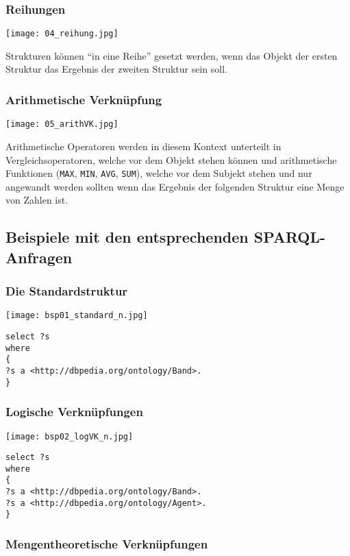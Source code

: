 \subsubsection*{Reihungen}
\texttt{[image: 04\_reihung.jpg]}


Strukturen können “in eine Reihe” gesetzt werden, wenn das Objekt der ersten Struktur das Ergebnis der zweiten Struktur sein soll.

\subsubsection*{Arithmetische Verknüpfung}
\texttt{[image: 05\_arithVK.jpg]}

Arithmetische Operatoren werden in diesem Kontext unterteilt in Vergleichsoperatoren, welche vor dem Objekt stehen können und arithmetische Funktionen (\verb+MAX+, \verb+MIN+, \verb+AVG+, \verb+SUM+), welche vor dem Subjekt stehen und nur angewandt werden sollten wenn das Ergebnis der folgenden Struktur eine Menge von Zahlen ist.

\subsection*{Beispiele mit den entsprechenden SPARQL-Anfragen}

\subsubsection*{Die Standardstruktur}

\texttt{[image: bsp01\_standard\_n.jpg]}

\begin{verbatim}
select ?s
where
{
?s a <http://dbpedia.org/ontology/Band>.
}
\end{verbatim}

\subsubsection*{Logische Verknüpfungen}

\texttt{[image: bsp02\_logVK\_n.jpg]}

\begin{verbatim}
select ?s
where
{
?s a <http://dbpedia.org/ontology/Band>.
?s a <http://dbpedia.org/ontology/Agent>.
}
\end{verbatim}

\subsubsection*{Mengentheoretische Verknüpfungen}

